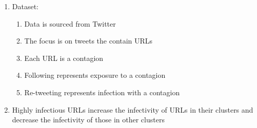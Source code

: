 \documentclass[11pt]{article}
\begin{document}
\begin{enumerate}
\begin{enumerate}
    \end{enumerate}
    \item Dataset:
    \begin{enumerate}
        \item Data is sourced from Twitter
        \item The focus is on tweets the contain URLs
        \item Each URL is a contagion
        \item Following represents exposure to a contagion
        \item Re-tweeting represents infection with a contagion
    \end{enumerate}
    \item Highly infectious URLs increase the infectivity of URLs in their clusters and decrease the infectivity of those in other clusters
    
\end{enumerate}

\section{}
\end{document}
